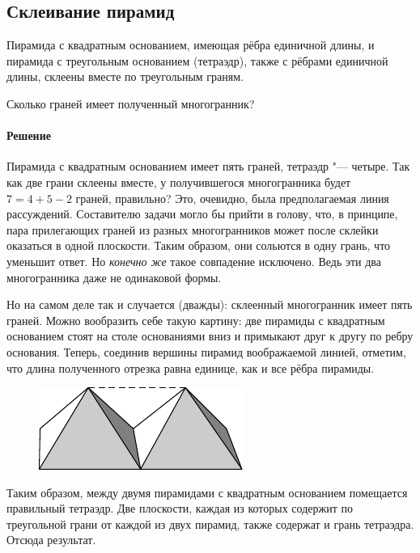 \documentclass[twoside]{book}
\makeatletter
\newcommand{\rindex}[2][\imki@jobname]{%
  \index[#1]{\detokenize{#2}}%
}
\makeatother
\begin{document}
\subsection*{Склеивание пирамид}%
\rindex{Склеивание пирамид}

Пирамида с квадратным основанием, имеющая рёбра единичной длины, и пирамида с треугольным основанием (тетраэдр), также с рёбрами единичной длины, склеены вместе по треугольным граням.

Сколько граней имеет полученный многогранник?

\paragraph{Решение}

Пирамида с квадратным основанием имеет пять граней, тетраэдр "--- четыре.
Так как две грани склеены вместе, у получившегося многогранника будет $7=4+5-2$ граней, правильно?
Это, очевидно, была предполагаемая линия рассуждений.
Составителю задачи могло бы прийти в голову, что, в принципе, пара прилегающих граней из разных многогранников может после склейки оказаться в одной плоскости.
Таким образом, они сольются в одну грань, что уменьшит ответ.
Но \emph{конечно же} такое совпадение исключено.
Ведь эти два многогранника даже не одинаковой формы.

Но на самом деле так и случается (дважды):
склеенный многогранник имеет пять граней.
Можно вообразить себе такую картину: две пирамиды с квадратным основанием стоят на столе основаниями вниз 
и примыкают друг к другу по ребру основания.
Теперь, соединив вершины пирамид воображаемой линией, отметим, что длина полученного отрезка равна единице, как и все рёбра пирамиды. 

\begin{figure}[!ht]
\centering
\includegraphics{mp/wink-6}
\end{figure}

Таким образом, между двумя пирамидами с квадратным основанием помещается правильный тетраэдр.
Две плоскости, каждая из которых содержит по треугольной грани от каждой из двух пирамид, также содержат и грань тетраэдра.
Отсюда результат. 
\heart 
\end{document}
